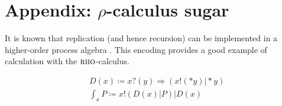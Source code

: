 \documentclass[]{acm_proc_article-sp}
\newcommand{\lpquote}{\ulcorner}
\newcommand{\rpquote}{\urcorner}
\newcommand{\id}[1]{\texttt{#1}}
\newcommand{\juxtap}{\mathbin{\id{|}}}
\newcommand{\concat}{\Rightarrow}
\newcommand{\binpar}[2]{#1 \juxtap #2}
\newcommand{\outputp}[2]{#1 ! ( * #2 )}
\newcommand{\prefix}[3]{#1 ? ( #2 ) \concat #3}
\newcommand{\lift}[2]{#1 ! ( #2 )}
\newcommand{\dropn}[1]{*#1}
\newcommand{\xbangp}[2]{\int_{#2} #1}
\newcommand{\defneqls}{\coloneqq}
\numberwithin{equation}{subsection}
\newcommand{\rhoc}{${\textsc{rho}}$-calculus}
\begin{document}
\section{Appendix: $\rho$-calculus sugar}

It is known that replication (and hence recursion) can be implemented
in a higher-order process algebra \cite{SangiorgiWalker}. This
encoding provides a good example of calculation with the {\rhoc}.


\begin{equation*}
  \begin{aligned}
    & D(x) \defneqls \prefix{x}{y}{(\binpar{\outputp{x}{y}}{\dropn{y}})} \\
    & \xbangp{P}{x} \defneqls \binpar{\lift{x}{\binpar{D(x)}{P}}}{D(x)} \\
  \end{aligned}
\end{equation*}
\end{document}
